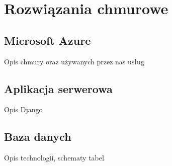 \chapter{Rozwiązania chmurowe}

\section*{Microsoft Azure}

Opis chmury oraz używanych przez nas usług

\section*{Aplikacja serwerowa}

Opis Django

\section*{Baza danych}

Opis technologii, schematy tabel